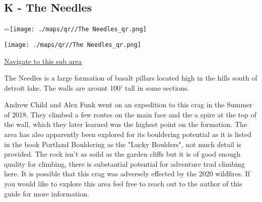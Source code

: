 	\begin{multicols}{2}

\section{K - The Needles}\label{sa:The Needles}
=\hbox{\texttt{[image: ./maps/qr//The Needles\_qr.png]}}%
\begin{center}
\texttt{[image: ./maps/qr//The Needles\_qr.png]}
\end{center}
\begin{center}
\underline{\textcolor{blue}{\href{http://maps.google.com/maps?q=44.59672447306725,-122.15597149494864}{Navigate to this sub area}}}
\end{center}


The Needles is a large formation of basalt pillars located high in the hills south of detroit lake. The walls are arount 100' tall in some sections.

Andrew Child and Alex Funk went on an expedition to this crag in the Summer of 2018. They climbed a few routes on the main face and the a spire at the top of the wall, which they later learned was the highest point on the formation. The area has also apparently been explored for its bouldering potential as it is listed in the book Portland Bouldering as the "Lucky Boulders", not much detail is provided. The rock isn't as soild as the garden cliffs but it is of good enough quality for climbing, there is substantial potential for adventure trad climbing here. It is possible that this crag was adversely effected by the 2020 wildfires. If you would like to explore this area feel free to reach out to the author of this guide for more information.\\





\end{multicols}
\clearpage